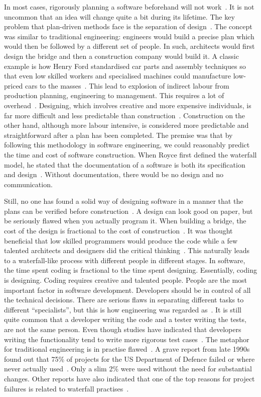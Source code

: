 \documentclass[english]{tktltiki2}
\begin{document}
In most cases, rigorously planning a software beforehand will not work~\cite{LB03}. It is not uncommon that an idea will change quite a bit during its lifetime. The key problem that plan-driven  methods face is the separation of design~\cite{LB03, Fow05}. The concept was similar to traditional engineering: engineers would build a precise plan which would then be followed by a different set of people. In such, architects would first design the bridge and then a construction company would build it. A classic example is how Henry Ford standardised car parts and assembly techniques so that even low skilled workers and specialised machines could manufacture low-priced cars to the masses~\cite{Pop02}. This lead to explosion of indirect labour from production planning, engineering to management. This requires a lot of overhead~\cite{Pop02}. Designing, which involves creative and more expensive individuals, is far more difficult and less predictable than construction~\cite{Fow05}. Construction on the other hand, although more labour intensive, is considered more predictable and straightforward after a plan has been completed. The premise was that by following this methodology in software engineering, we could reasonably predict the time and cost of software construction. When Royce first defined the waterfall model, he stated that the documentation of a software is both its specification and design~\cite{Roy70}. Without documentation, there would be no design and no communication.

Still, no one has found a solid way of designing software in a manner that the plans can be verified before construction~\cite{Fow05}. A design can look good on paper, but be seriously flawed when you actually program it. When building a bridge, the cost of the design is fractional to the cost of construction~\cite{Fow05}. It was thought beneficial that low skilled programmers would produce the code while a few talented architects and designers did the critical thinking~\cite{Pop02}. This naturally leads to a waterfall-like process with different people in different stages. In software, the time spent coding is fractional to the time spent designing. Essentially, coding is designing. Coding requires creative and talented people. People are the most important factor in software development. Developers should be in control of all the technical decisions. There are serious flaws in separating different tasks to different “specialists”, but this is how engineering was regarded as~\cite{Roy70}. It is still quite common that a developer writing the code and a tester writing the tests, are not the same person. Even though studies have indicated that developers writing the functionality tend to write more rigorous test cases~\cite{MND09}. The metaphor for traditional engineering is in practise flawed~\cite{Fow05}. A grave report from late 1990s found out that 75\% of projects for the US Department of Defence failed or where never actually used~\cite{LB03}. Only a slim 2\% were used without the need for substantial changes. Other reports have also indicated that one of the top reasons for project failures is related to waterfall practises~\cite{LB03}.
\end{document}

